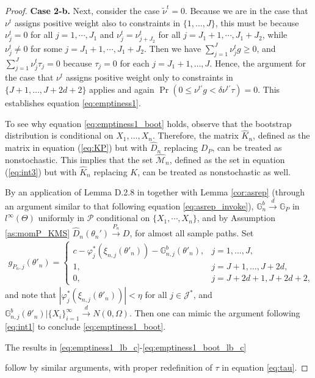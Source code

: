 \documentclass[letterpaper,11pt]{article}
\theoremstyle{myplain}
\theoremstyle{mydefinition}
\theoremstyle{myremark}
\renewcommand{\cite}{\citet}
\newcommand{\G}{\mathbb{G}}
\newcommand{\cM}{\mathcal{M}}
\newcommand{\cP}{\mathcal{P}}
\numberwithin{equation}{section}
\numberwithin{figure}{section}
\begin{document}
\begin{appendices}
\begin{proof}
\noindent \textbf{Case 2-b.} Next, consider the case $\tilde\nu^t=0$. Because we are in the case that $\nu^t$ assigns positive weight also to constraints in $\{1,\dots,J\}$, this must be because  $\nu^t_j=0$ for all $j=1,\cdots,J_1$ and $\nu^t_j=\nu^t_{j+J_2}$ for all $j=J_1+1,\cdots,J_1+J_2$, while $\nu^t_j\neq 0$ for some $j=J_1+1,\cdots,J_1+J_2$. Then we have $\sum_{j=1}^J \nu^t_j g\ge 0$, and 
$\sum_{j=1}^J\nu_j^t\tau_j=0$ because $\tau_j=0$ for each $j=J_1+1,\dots,J$. Hence, the argument for the case that $\nu^t$ assigns positive weight only to constraints in $\{J+1,\dots,J+2d+2\}$ applies and again ${\Pr}\left(0\le\nu^{t\prime}g< \delta\nu^{t\prime}\tau \right)=0$. This establishes equation \eqref{eq:emptiness1}.

To see why equation \eqref{eq:emptiness1_boot} holds, observe that the bootstrap distribution is conditional on $X_1,\dots,X_n$. Therefore, the matrix $\hat{K}_{n}$, defined as the matrix in equation (\ref{eq:KP}) but with $\hat{D}_{n}$ replacing $D_{P}$, can be treated as nonstochastic. This implies that the set $\hat{\cM}_n$, defined as the set in equation (\ref{eq:int3}) but with $\hat{K}_{n}$ replacing $K$, can be treated as nonstochastic as well. 

By an application of Lemma D.2.8 in \cite{BCS14_misp} together with Lemma \ref{cor:asrep} (through an argument similar to that following equation \eqref{eq:asrep_invoke}), $\mathbb G^b_{n}\stackrel{d}{\to}\mathbb G_P$ in $l^\infty(\Theta)$ uniformly in $\cP$ conditional on $\{X_1,\cdots,X_n\}$, and by Assumption \ref{as:momP_KMS} $\hat D_n(\theta_n')\stackrel{P_n}{\to} D$, for almost all sample paths.
\color{black}
Set
\begin{align}
g_{P_n,j}(\theta'_n) =\left\{ \begin{array}{lll}
 c -\varphi^*_j(\xi_{n,j}(\theta'_n))- \G^b_{n,j}(\theta'_n), &  j=1,\dots,J,\\
 1, &  j=J+1,\dots,J+2d,\\
0, & j=J+2d+1,J+2d+2,
	\end{array} 
	\right. 
\end{align}
and note that $|\varphi^*_j(\xi_{n,j}(\theta'_n))|<\eta$   for all $j\in\mathcal J^*$, and $\G^b_{n,j}(\theta'_n)|\{X_i\}_{i=1}^\infty\stackrel{d}{\to} N(0,\Omega)$.
Then one can mimic the argument following \eqref{eq:int1} to conclude \eqref{eq:emptiness1_boot}.

The results in \eqref{eq:emptiness1_lb_c}-\eqref{eq:emptiness1_boot_lb_c} 

follow by similar arguments, with proper redefinition of $\tau$ in equation \eqref{eq:tau}.
\end{proof}


\end{appendices}
\end{document}
